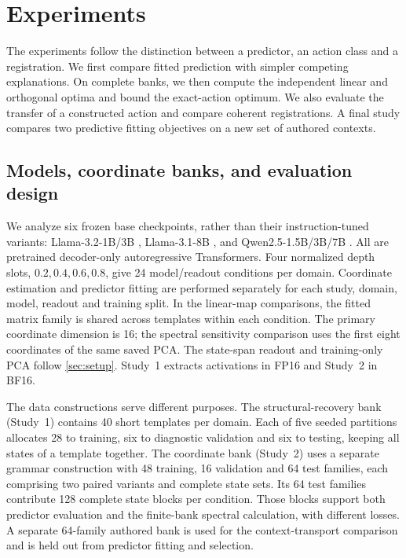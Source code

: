 \section{Experiments}
\label{sec:pending-studies}
\label{sec:evidence}
The experiments follow the distinction between a predictor, an action class and a registration. We first compare fitted prediction with simpler competing explanations. On complete banks, we then compute the independent linear and orthogonal optima and bound the exact-action optimum. We also evaluate the transfer of a constructed action and compare coherent registrations. A final study compares two predictive fitting objectives on a new set of authored contexts.

\subsection{Models, coordinate banks, and evaluation design}
\label{sec:design}
We analyze six frozen base checkpoints, rather than their instruction-tuned variants: Llama-3.2-1B/3B \citep{meta2024llama32}, Llama-3.1-8B \citep{grattafiori2024llama3}, and Qwen2.5-1.5B/3B/7B \citep{qwen2025technical}. All are pretrained decoder-only autoregressive Transformers. Four normalized depth slots, $0.2,0.4,0.6,0.8$, give 24 model/readout conditions per domain. Coordinate estimation and predictor fitting are performed separately for each study, domain, model, readout and training split. In the linear-map comparisons, the fitted matrix family is shared across templates within each condition. The primary coordinate dimension is 16; the spectral sensitivity comparison uses the first eight coordinates of the same saved PCA. The state-span readout and training-only PCA follow \cref{sec:setup}. Study~1 extracts activations in FP16 and Study~2 in BF16.

The data constructions serve different purposes. The structural-recovery bank (Study~1) contains 40 short templates per domain. Each of five seeded partitions allocates 28 to training, six to diagnostic validation and six to testing, keeping all states of a template together. The coordinate bank (Study~2) uses a separate grammar construction with 48 training, 16 validation and 64 test families, each comprising two paired variants and complete state sets. Its 64 test families contribute 128 complete state blocks per condition. Those blocks support both predictor evaluation and the finite-bank spectral calculation, with different losses. A separate 64-family authored bank is used for the context-transport comparison and is held out from predictor fitting and selection.

